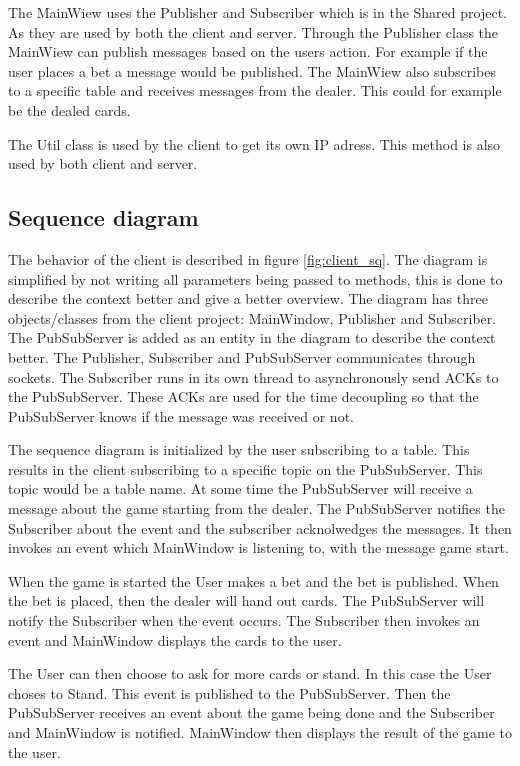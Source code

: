 The MainWiew uses the Publisher and Subscriber which is in the Shared project. As they are used by both the client and server. Through the Publisher class the MainWiew can publish messages based on the users action. For example if the user places a bet a message would be published. The MainWiew also subscribes to a specific table and receives messages from the dealer. This could for example be the dealed cards.

The Util class is used by the client to get its own IP adress. This method is also used by both client and server.

\FloatBarrier

\subsection{Sequence diagram}
The behavior of the client is described in figure \ref{fig:client_sq}. The diagram is simplified by not writing all parameters being passed to methods, this is done to describe the context better and give a better overview. The diagram has three objects/classes from the client project: MainWindow, Publisher and Subscriber. The PubSubServer is added as an entity in the diagram to describe the context better. The Publisher, Subscriber and PubSubServer communicates through sockets. The Subscriber runs in its own thread to asynchronously send ACKs to the PubSubServer. These ACKs are used for the time decoupling so that the PubSubServer knows if the message was received or not.

The sequence diagram is initialized by the user subscribing to a table. This results in the client subscribing to a specific topic on the PubSubServer. This topic would be a table name. At some time the PubSubServer will receive a message about the game starting from the dealer. The PubSubServer notifies the Subscriber about the event and the subscriber acknolwedges the messages. It then invokes an event which MainWindow is listening to, with the message game start. 

When the game is started the User makes a bet and the bet is published. When the bet is placed, then the dealer will hand out cards. The PubSubServer will notify the Subscriber when the event occurs. The Subscriber then invokes an event and MainWindow displays the cards to the user. 

The User can then choose to ask for more cards or stand. In this case the User choses to Stand. This event is published to the PubSubServer. Then the PubSubServer receives an event about the game being done and the Subscriber and MainWindow is notified. MainWindow then displays the result of the game to the user.

